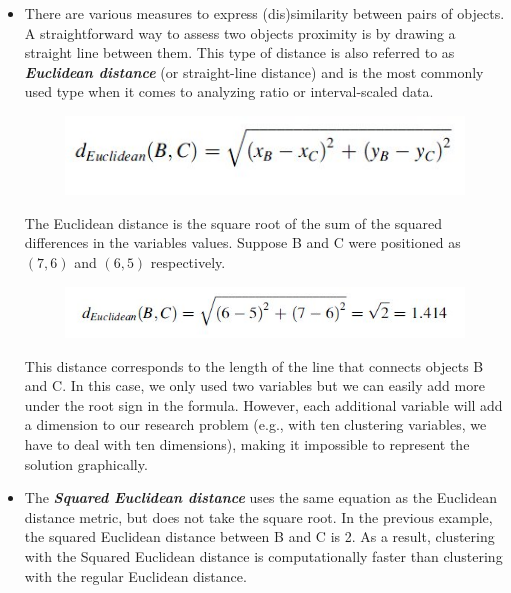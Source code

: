 \documentclass[a4paper,12pt]{article}
\begin{document}

\begin{itemize}
\item There are various measures to express (dis)similarity between pairs of objects.
A straightforward way to assess two objects proximity is by drawing a straight line
between them. This type of distance is also referred to as
\textbf{\textit{Euclidean distance}} (or straight-line distance) and is the most commonly used type
when it comes to analyzing ratio or interval-scaled data.
\begin{figure}[h!]
	\begin{center}
		\includegraphics[scale=0.6]{images/EuclidDistance1.jpg}\\
	\end{center}
\end{figure}

The Euclidean distance is the square root of the sum of the squared differences in
the variables values. Suppose B and C were positioned as $(7,6)$ and $(6,5)$ respectively.
\begin{figure}[h!]
	\begin{center}
		\includegraphics[scale=0.6]{images/EuclidDistance2.jpg}\\
	\end{center}
\end{figure}

This distance corresponds to the length of the line that connects objects B and C.
In this case, we only used two variables but we can easily add more under the root
sign in the formula. However, each additional variable will add a dimension to our
research problem (e.g., with ten clustering variables, we have to deal with ten
dimensions), making it impossible to represent the solution graphically.

\item  The \textbf{\textit{Squared Euclidean distance}} uses the same equation as the Euclidean distance metric, but does not take the square root. In the previous example, the squared Euclidean distance between B and C is 2.
As a result, clustering with the Squared Euclidean distance is computationally faster than clustering with the regular Euclidean distance.


\end{itemize}
\end{document}
